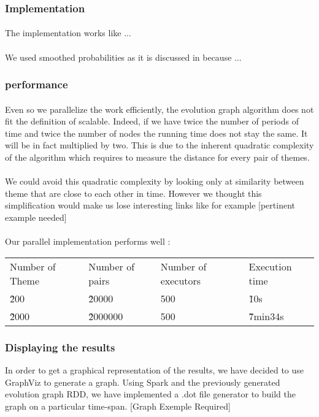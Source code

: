 \subsubsection{Implementation}
\label{sec:EvoGraImp}
\paragraph{}
The implementation works like ...

\paragraph{}
We used smoothed probabilities as it is discussed in \cite{de2010grammatical} because ... 

\subsubsection{performance}
\paragraph{}
Even so we parallelize the work efficiently, the evolution graph algorithm does not fit the definition of scalable. Indeed, if we have twice the number of periods of time and twice the number of nodes the running time does not stay the same. It will be in fact multiplied by two. This is due to the inherent quadratic complexity of the algorithm which requires to measure the distance for every pair of themes.

\paragraph{}
We could avoid this quadratic complexity by looking only at similarity between theme that are close to each other in time. However we thought this simplification would make us lose interesting links like for example [pertinent example needed]

\paragraph{}
Our parallel implementation performs well :
\newline
\begin{tabular}{llll}
Number of Theme & Number of pairs & Number of executors & Execution time \\
\~ 200 & \~ 20000 & 500 & \~ 10s \\
\~ 2000 & \~ 2000000 & 500 & \~ 7min34s \\
\end{tabular}


\subsubsection{Displaying the results}
In order to get a graphical representation of the results, we have decided to use GraphViz to generate a graph. Using Spark and the previously generated evolution graph RDD, we have implemented a .dot file generator to build the graph on a particular time-span.
[Graph Exemple Required]
